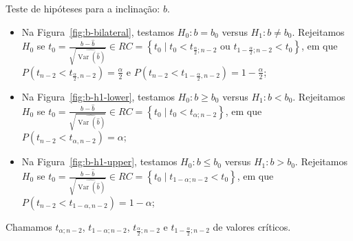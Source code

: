 \documentclass[8pt]{beamer}
\DeclareMathOperator{\vari}{Var}
\begin{document}
\begin{frame}{Teste de hipóteses para  a inclinação: $b$.}

\begin{itemize}
	\item Na Figura~\ref{fig:b-bilateral}, testamos $H_0: b = b_0$ versus $H_1: b \neq b_0$. Rejeitamos $H_0$ se $t_0 = \frac{b  - \hat{b}}{\sqrt{\widehat{\vari({\hat{b}})}}} \allowbreak  \in RC = \left\{ t_0 \mid t_0 < t_{\frac{\alpha}{2};n-2}\mbox{ ou } t_{1-\frac{\alpha}{2}; n-2} < t_0 \right\}$, em que $P\left(t_{n-2} < t_{\frac{\alpha}{2},n-2}\right) = \frac{\alpha}{2}$ e $P\left(t_{n-2} < t_{1-\frac{\alpha}{2},n-2}\right) = 1-\frac{\alpha}{2}$;
	\vfill
	
	\item Na Figura~\ref{fig:b-h1-lower}, testamos $H_0: b \geq b_0$ versus $H_1: b < b_0$. Rejeitamos $H_0$ se $t_0 = \frac{b  - \hat{b}}{\sqrt{\widehat{\vari({\hat{b}})}}} \allowbreak  \in RC = \left\{ t_0 \mid t_0 < t_{\alpha;n-2} \right\}$, em que $P\left(t_{n-2} < t_{\alpha,n-2}\right) = \alpha$;
	\vfill
	
	\item Na Figura~\ref{fig:b-h1-upper}, testamos $H_0: b \leq b_0$ versus $H_1: b > b_0$. Rejeitamos $H_0$ se $t_0 = \frac{b  - \hat{b}}{\sqrt{\widehat{\vari({\hat{b}})}}} \allowbreak  \in RC = \left\{ t_0 \mid  t_{1-\alpha; n-2} < t_0 \right\}$, em que $P\left(t_{n-2} < t_{1-\alpha,n-2}\right) =1- \alpha$;
\end{itemize}

Chamamos $t_{\alpha; n-2}$, $t_{1-\alpha; n-2}$, $t_{\frac{\alpha}{2}; n-2}$ e $t_{1-\frac{\alpha}{2}; n-2}$ de valores críticos.

\end{frame}
\end{document}

